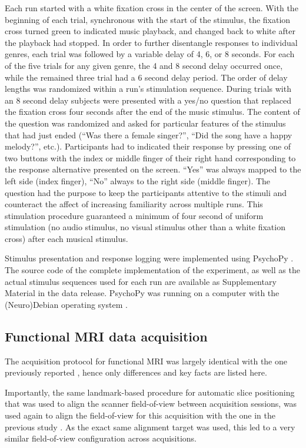 Each run started with a white fixation cross in the center of the screen. With
the beginning of each trial, synchronous with the start of the stimulus, the
fixation cross turned green to indicated music playback, and changed back to
white after the playback had stopped.  In order to further disentangle
responses to individual genres, each trial was followed by a variable delay of
4, 6, or 8 seconds. For each of the five trials for any given genre, the 4 and
8 second delay occurred once, while the remained three trial had a 6 second
delay period. The order of delay lengths was randomized within a run's
stimulation sequence. During trials with an 8 second delay subjects were
presented with a yes/no question that replaced the fixation cross four seconds
after the end of the music stimulus. The content of the question was randomized
and asked for particular features of the stimulus that had just ended (``Was
there a female singer?'', ``Did the song have a happy melody?'', etc.).
Participants had to indicated their response by pressing one of two buttons
with the index or middle finger of their right hand corresponding to the
response alternative presented on the screen. ``Yes'' was always mapped to the
left side (index finger), ``No'' always to the right side (middle finger).  The
question had the purpose to keep the participants attentive to the stimuli and
counteract the affect of increasing familiarity across multiple runs.  This
stimulation procedure guaranteed a minimum of four second of uniform
stimulation (no audio stimulus, no visual stimulus other than a white fixation
cross) after each musical stimulus.

Stimulus presentation and response logging were implemented using PsychoPy
\cite{19198666}.  The source code of the complete implementation of the experiment, as
well as the actual stimulus sequences used for each run are available as
Supplementary Material in the data release. PsychoPy was running on a computer
with the (Neuro)Debian operating system \cite{23055966}.

\subsection*{Functional MRI data acquisition}

The acquisition protocol for functional MRI was largely identical with the one
previously reported \cite{Hanke_2014}, hence only differences and key facts are
listed here.

Importantly, the same landmark-based procedure for automatic slice positioning
that was used to align the scanner field-of-view between acquisition sessions,
was used again to align the field-of-view for this acquisition with the one in
the previous study \cite{Hanke_2014}. As the exact same alignment target was
used, this led to a very similar field-of-view configuration across
acquisitions.

